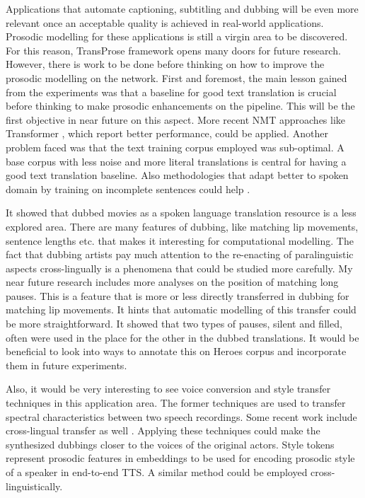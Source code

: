 Applications that automate captioning, subtitling and dubbing will be even more relevant once an acceptable quality is achieved in real-world applications. Prosodic modelling for these applications is still a virgin area to be discovered. For this reason, TransProse framework opens many doors for future research. However, there is work to be done before thinking on how to improve the prosodic modelling on the network. First and foremost, the main lesson gained from the experiments was that a baseline for good text translation is crucial before thinking to make prosodic enhancements on the pipeline. This will be the first objective in near future on this aspect. More recent NMT approaches like Transformer \citep{transformer}, which report better performance, could be applied. Another problem faced was that the text training corpus employed was sub-optimal. A base corpus with less noise and more literal translations is central for having a good text translation baseline. Also methodologies that adapt better to spoken domain by training on incomplete sentences could help \citep{niehues2018}. 

It showed that dubbed movies as a spoken language translation resource is a less explored area. There are many features of dubbing, like matching lip movements,  sentence lengths etc. that makes it interesting for computational modelling. The fact that dubbing artists pay much attention to the re-enacting of paralinguistic aspects cross-lingually is a phenomena that could be studied more carefully. My near future research includes more analyses on the position of matching long  pauses. This is a feature that is more or less directly transferred in dubbing for matching lip movements. It hints that automatic modelling of this transfer could be more straightforward. It showed that two types of pauses, silent and filled, often were used in the place for the other in the dubbed translations. It would be beneficial to look into ways to annotate this on Heroes corpus and incorporate them in future experiments. 

Also, it would be very interesting to see voice conversion \citep{Turk, Kaneko} and style transfer techniques \citep{style_tokens} in this application area. The former techniques are used to transfer spectral characteristics between two speech recordings. Some recent work include cross-lingual transfer as well \citep{crosslingual}. Applying these techniques could make the synthesized dubbings closer to the voices of the original actors. Style tokens represent prosodic features in embeddings to be used for encoding prosodic style of a speaker in end-to-end TTS. A similar method could be employed cross-linguistically.  

